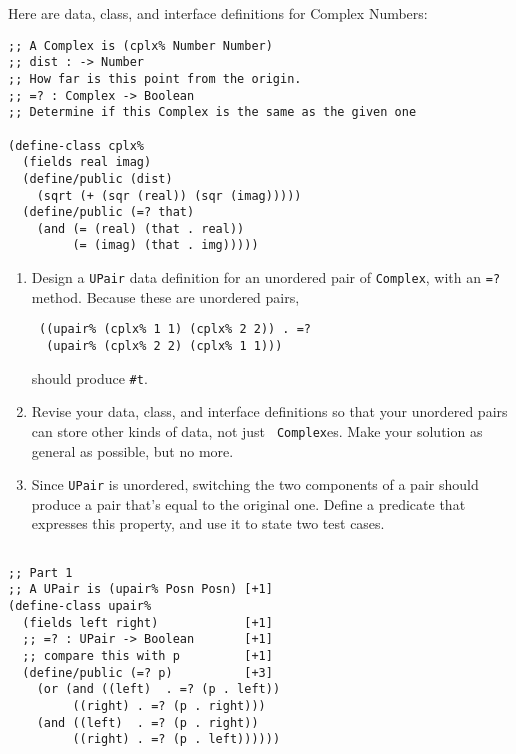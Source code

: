 \documentclass[12pt]{article}                   %
\def\pts#1{\marginpar{\footnotesize \raggedright  \fbox{#1 {\sc Points}}}}
\newenvironment{solution}{}{}
\begin{document}
\begin{problem}\pts{20}

Here are data, class, and interface definitions for Complex Numbers:

\begin{verbatim}
;; A Complex is (cplx% Number Number)
;; dist : -> Number
;; How far is this point from the origin.
;; =? : Complex -> Boolean
;; Determine if this Complex is the same as the given one

(define-class cplx%
  (fields real imag)
  (define/public (dist)
    (sqrt (+ (sqr (real)) (sqr (imag)))))
  (define/public (=? that) 
    (and (= (real) (that . real))
         (= (imag) (that . img)))))

\end{verbatim}

\begin{enumerate}
\item Design a {\tt UPair} data definition for an unordered pair of
  {\tt Complex}, with an {\tt =?}  method.  Because these are
  unordered pairs, 

\begin{verbatim}
 ((upair% (cplx% 1 1) (cplx% 2 2)) . =?
  (upair% (cplx% 2 2) (cplx% 1 1)))
\end{verbatim}

should produce {\tt \#t}.

\newpage
\item Revise your data, class, and interface definitions so that your
  unordered pairs can store other kinds of data, not just {\tt
    Complex}es.  Make your solution as general as possible, but no more.

\newpage
\item Since {\tt UPair} is unordered, switching the two components of
  a pair should produce a pair that's equal to the original one.
  Define a predicate that expresses this property, and use it to state
  two test cases.

\end{enumerate}




\begin{solution}
\begin{verbatim} 

;; Part 1
;; A UPair is (upair% Posn Posn) [+1]
(define-class upair%
  (fields left right)            [+1]
  ;; =? : UPair -> Boolean       [+1]
  ;; compare this with p         [+1]
  (define/public (=? p)          [+3]
    (or (and ((left)  . =? (p . left))
	     ((right) . =? (p . right)))
	(and ((left)  . =? (p . right))
	     ((right) . =? (p . left))))))


\end{verbatim}
\end{solution}
\end{problem}
\end{document}
